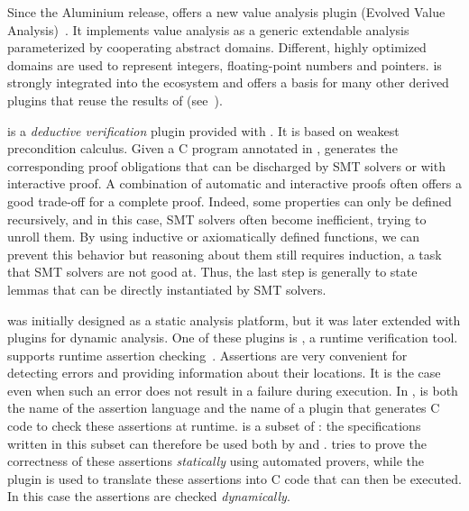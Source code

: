 Since the \framac Aluminium release, \framac offers a new value
analysis plugin \Eva (Evolved Value Analysis)~\cite{eva-manual}.  It
implements value analysis as a generic extendable analysis
parameterized by cooperating abstract domains.  Different, highly
optimized domains are used to represent integers, floating-point
numbers and pointers.  \Eva is strongly integrated into the \framac
ecosystem and offers a basis for many other derived plugins that reuse
the results of \Eva (see~\cite{KKP2015:FAC}).

\Wp is a \emph{deductive verification} plugin provided with
\framac. It is based on weakest precondition calculus. Given a C
program annotated in \acsl, \Wp generates the corresponding proof
obligations that can be discharged by SMT solvers or with interactive
proof.  A combination of automatic and interactive proofs often offers
a good trade-off for a complete proof. Indeed, some properties can
only be defined recursively, and in this case, SMT solvers often
become inefficient, trying to unroll them. By using inductive or
axiomatically defined functions, we can prevent this behavior but
reasoning about them still requires induction, a task that SMT solvers
are not good at. Thus, the last step is generally to state lemmas that
can be directly instantiated by SMT solvers.

\framac was initially designed as a static analysis platform, but it
was later extended with plugins for dynamic analysis. One of these
plugins is \eacsl, a runtime verification tool.  \eacsl supports runtime assertion
checking~\cite{CR2006:SEN}. Assertions are very convenient for
detecting errors and providing information about their locations.  It
is the case even when such an error does not result in a failure
during execution. 
In \framac, \eacsl is both the name of the assertion language and the
name of a plugin that generates C code to check these assertions at
runtime. \eacsl is a subset of \acsl: the specifications written in this subset
can therefore be used both by \Wp and \eacsl. \Wp tries to prove
the correctness of these assertions {\em statically} using automated
provers, while the plugin \eacsl is used to translate these assertions into C
code that can then be executed. In this case the assertions are
checked {\em dynamically}.


